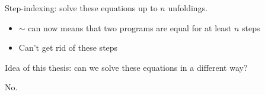 \documentclass{beamer}
\begin{document}
\begin{frame}
  Step-indexing: solve these equations up to $n$ unfoldings.

  \begin{itemize}
  \item $\sim$ can now means that two programs are equal for at least
    $n$ steps
  \item Can't get rid of these steps
  \end{itemize}
\end{frame}

\begin{frame}
  \centering
  Idea of this thesis: can we solve these equations in a different
  way?

  \pause
  \bigskip

  No.
\end{frame}
\end{document}
